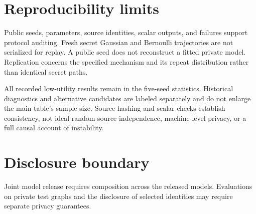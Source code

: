 \section{Reproducibility limits}
Public seeds, parameters, source identities, scalar outputs, and failures support protocol auditing. Fresh secret Gaussian and Bernoulli trajectories are not serialized for replay. A public seed does not reconstruct a fitted private model. Replication concerns the specified mechanism and its repeat distribution rather than identical secret paths.

All recorded low-utility results remain in the five-seed statistics. Historical diagnostics and alternative candidates are labeled separately and do not enlarge the main table's sample size. Source hashing and scalar checks establish consistency, not ideal random-source independence, machine-level privacy, or a full causal account of instability.

\section{Disclosure boundary}
Joint model release requires composition across the released models. Evaluations on private test graphs and the disclosure of selected identities may require separate privacy guarantees.
